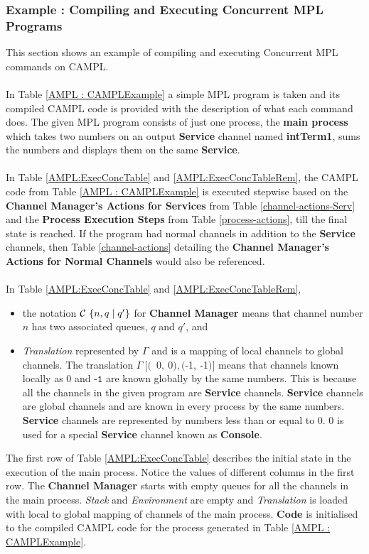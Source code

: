 \documentclass[11pt]{article}
\newcommand{\<}{\langle}
\renewcommand{\>}{\rangle}
\begin{document}
\subsubsection {Example : Compiling and Executing Concurrent MPL Programs}
This section shows an example of compiling and executing Concurrent MPL commands on CAMPL. 
~~\\~~\\
In Table \ref {AMPL : CAMPLExample} a simple MPL program is taken and its compiled CAMPL code is provided with the description of what each command does. The given MPL program consists of just one process, the {\bf main process} which takes two numbers on an output {\bf Service} channel named {\bf intTerm1}, sums the numbers and displays them on the same {\bf Service}. 
~~\\~~\\ 
In Table \ref {AMPL:ExecConcTable} and \ref {AMPL:ExecConcTableRem}, the CAMPL code from Table \ref {AMPL : CAMPLExample} is executed stepwise based on the {\bf Channel Manager's Actions for Services} from Table \ref {channel-actions-Serv}  and the {\bf Process Execution Steps} from Table \ref {process-actions}, till the final state is reached. If the program had normal channels in addition to the {\bf Service} channels, then Table \ref {channel-actions} detailing the  {\bf Channel Manager's Actions for Normal Channels} would also be referenced. 
~~\\~~\\ 
In Table \ref {AMPL:ExecConcTable} and \ref {AMPL:ExecConcTableRem},
\begin {itemize}
 \item the notation ${\cal C}~\{n, q \mid q'\}$ for {\bf Channel Manager} means that channel number $n$ has two associated queues, $q$ and $q'$, and  
 \item {\em Translation} represented by $\Gamma$ and is a mapping of local channels to global channels. The translation $\Gamma~\big[\big($~0$,~$0$),\big($-1$,~$-1$)\big]$ means that channels known locally as $0$ and $\texttt{-1}$ are known globally by the same numbers. This is because all the channels in the given program are {\bf Service} channels. {\bf Service} channels are global channels and are known in every process by the same numbers. {\bf Service} channels are represented by numbers less than or equal to 0. 0 is used for a special {\bf Service} channel known as {\bf Console}. 
\end {itemize}
The first row of Table  \ref {AMPL:ExecConcTable} describes the initial state in the execution of the main process. Notice the values of different columns in the first row. The {\bf Channel Manager} starts with empty queues for all the channels in the main process. {\em Stack} and {\em Environment} are empty and {\em Translation} is loaded with local to global mapping of channels of the main process. {\bf Code} is initialised to the compiled CAMPL code for the process generated in Table \ref {AMPL : CAMPLExample}.
\end{document}

